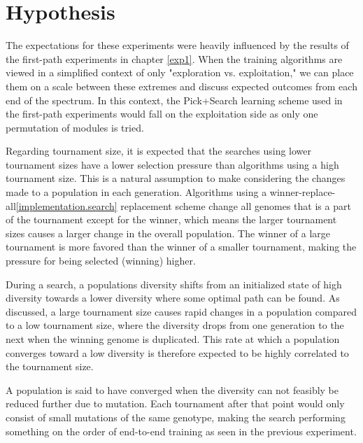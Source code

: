\section{Hypothesis}
\label{exp2:hypothesis}
The expectations for these experiments were heavily influenced by the results of the first-path experiments in chapter \ref{exp1}. When the training algorithms are viewed in a simplified context of only "exploration vs. exploitation," we can place them on a scale between these extremes and discuss expected outcomes from each end of the spectrum. In this context, the Pick+Search learning scheme used in the first-path experiments would fall on the exploitation side as only one permutation of modules is tried.

Regarding tournament size, it is expected that the searches using lower tournament sizes have a lower selection pressure than algorithms using a high tournament size. This is a natural assumption to make considering the changes made to a population in each generation. Algorithms using a winner-replace-all\ref{implementation.search} replacement scheme change all genomes that is a part of the tournament except for the winner, which means the larger tournament sizes causes a larger change in the overall population. The winner of a large tournament is more favored than the winner of a smaller tournament, making the pressure for being selected (winning) higher. 

During a search, a populations diversity shifts from an initialized state of high diversity towards a lower diversity where some optimal path can be found. As discussed, a large tournament size causes rapid changes in a population compared to a low tournament size, where the diversity drops from one generation to the next when the winning genome is duplicated. This rate at which a population converges toward a low diversity is therefore expected to be highly correlated to the tournament size.

A population is said to have converged when the diversity can not feasibly be reduced further due to mutation. Each tournament after that point would only consist of small mutations of the same genotype, making the search performing something on the order of end-to-end training as seen in the previous experiment. 


